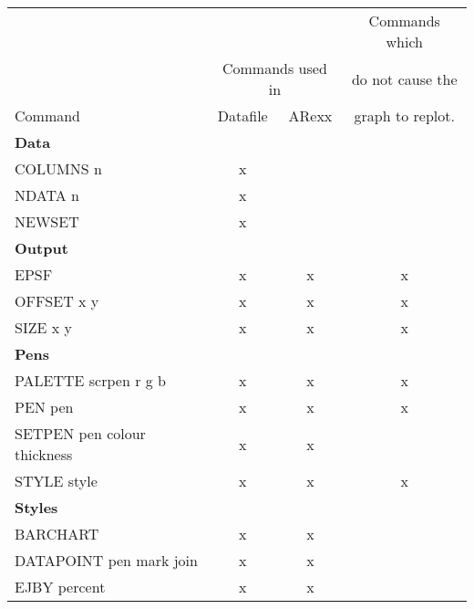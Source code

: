 \documentclass{report}
\begin{document}
\begin{center}
\scriptsize
\begin{tabular}{lccc} \hline
                                 &           &        & Commands which     \\
                                 & \multicolumn{2}{c}{Commands used in} %
                                                      & do not cause the   \\ \cline{2-3}
Command                          & Datafile  & ARexx  & graph to replot.   \\ \hline
{\bf Data}                       &           &        &                    \\
COLUMNS  n                       &     x     &        &                    \\
NDATA  n                         &     x     &        &                    \\
NEWSET                           &     x     &        &                    \\ \hline
{\bf Output}                     &           &        &                    \\
EPSF                             &     x     &     x  &       x            \\
OFFSET  x   y                    &     x     &     x  &       x            \\
SIZE  x   y                      &     x     &     x  &       x            \\ \hline
{\bf Pens}                       &           &        &                    \\
PALETTE  scrpen   r   g  b       &     x     &     x  &       x            \\
PEN  pen                         &     x     &     x  &       x            \\
SETPEN  pen   colour   thickness &     x     &     x  &                    \\
STYLE  style                     &     x     &     x  &       x            \\ \hline
{\bf Styles}                     &           &        &                    \\
BARCHART                         &     x     &     x  &                    \\
DATAPOINT  pen   mark   join     &     x     &     x  &                    \\
EJBY  percent                    &     x     &     x  &                    \\

\end{tabular}
\end{center}
\end{document}
